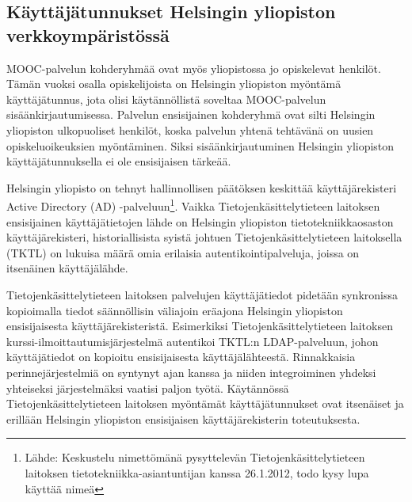 \documentclass[finnish,gradu]{tktltiki}
\begin{document}




  \subsection{Käyttäjätunnukset Helsingin yliopiston verkkoympäristössä} %
  \label{sub:autentikointi_helsingin_yliopiston_verkkoympäristössä}

  MOOC-palvelun kohderyhmää ovat myös yliopistossa jo opiskelevat henkilöt. Tämän vuoksi osalla opiskelijoista on Helsingin yliopiston myöntämä käyttäjätunnus, jota olisi käytännöllistä soveltaa MOOC-palvelun sisäänkirjautumisessa. Palvelun ensisijainen kohderyhmä ovat silti Helsingin yliopiston ulkopuoliset henkilöt, koska palvelun yhtenä tehtävänä on uusien opiskeluoikeuksien myöntäminen. Siksi sisäänkirjautuminen Helsingin yliopiston käyttäjätunnuksella ei ole ensisijaisen tärkeää.

  Helsingin yliopisto on tehnyt hallinnollisen päätöksen keskittää käyttäjärekisteri Active Directory (AD) -palveluun\footnote{Lähde: Keskustelu nimettömänä pysyttelevän Tietojenkäsittelytieteen laitoksen tietotekniikka-asiantuntijan kanssa 26.1.2012, todo kysy lupa käyttää nimeä}. Vaikka Tietojenkäsittelytieteen laitoksen ensisijainen käyttäjätietojen lähde on Helsingin yliopiston tietotekniikkaosaston käyttäjärekisteri, historiallisista syistä johtuen Tietojenkäsittelytieteen laitoksella (TKTL) on lukuisa määrä omia erilaisia autentikointipalveluja, joissa on itsenäinen käyttäjälähde.

  Tietojenkäsittelytieteen laitoksen palvelujen käyttäjätiedot pidetään synkronissa kopioimalla tiedot säännöllisin väliajoin eräajona Helsingin yliopiston ensisijaisesta käyttäjärekisteristä. Esimerkiksi Tietojenkäsittelytieteen laitoksen kurssi-ilmoittautumisjärjestelmä autentikoi TKTL:n LDAP-palveluun, johon käyttäjätiedot on kopioitu ensisijaisesta käyttäjälähteestä. Rinnakkaisia perinnejärjestelmiä on syntynyt ajan kanssa ja niiden integroiminen yhdeksi yhteiseksi järjestelmäksi vaatisi paljon työtä. Käytännössä Tietojenkäsittelytieteen laitoksen myöntämät käyttäjätunnukset ovat itsenäiset ja erillään Helsingin yliopiston ensisijaisen käyttäjärekisterin toteutuksesta.
\end{document}
